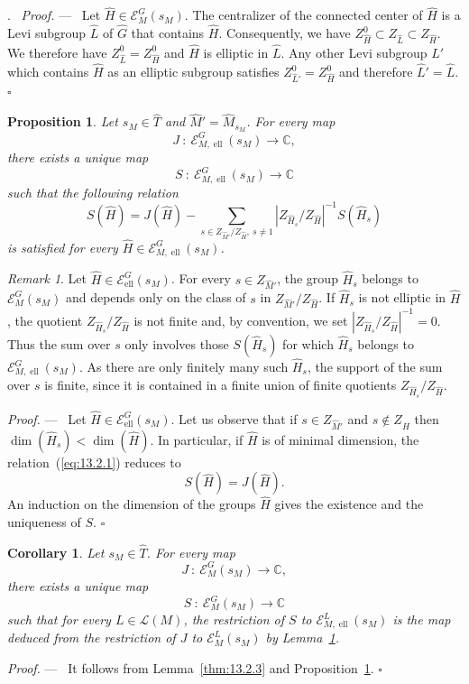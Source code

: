 \documentclass[12pt,a4paper,oneside,english,leqno]{smfart}
\makeatletter
\numberwithin{equation}{subsection}
\newcounter{theo}
\numberwithin{theo}{subsection}
\newenvironment{paragr}[1][]{\medskip\refstepcounter{subsection}%
  \par\noindent\hspace*{\parindent}\thesubsection.\ \emph{#1}%
  \@ifundefined{@empty}{}{}\ignorespaces}{\medskip}
\theoremstyle{plain}
\newtheorem{proposition}[theo]{Proposition}
\newtheorem{corollary}[theo]{Corollary}
\theoremstyle{definition}
\theoremstyle{remark}
\newtheorem{remark}[theo]{Remark}
\newenvironment{preuve}[1][]{\medskip\noindent\textit{Proof.} #1 ---\ }%
  {\hfill\ensuremath{\square}\medskip}
\DeclareMathOperator{\el}{ell}
\newcommand{\CC}{\mathbb{C}}
\newcommand{\ec}{\mathcal{E}}
\newcommand{\lc}{\mathcal{L}}
\newcommand{\Gc}{\widehat{G}}
\newcommand{\Tc}{\widehat{T}}
\newcommand{\Mc}{\widehat{M}}
\newcommand{\Lc}{\widehat{L}}
\newcommand{\Hc}{\widehat{H}}
\makeatother
\begin{document}
\begin{paragr}
\begin{preuve}
Let $\Hc\in\ec_M^G(s_M)$. The centralizer of the connected center of $\Hc$ is a Levi subgroup $\Lc$ of $\Gc$ that contains $\Hc$. Consequently, we have $Z_{\Hc}^0\subset Z_{\Lc}\subset Z_{\Hc}$. We therefore have $Z_{\Lc}^0=Z_{\Hc}^0$ and $\Hc$ is elliptic in $\Lc$. Any other Levi subgroup $\Lc'$ which contains $\Hc$ as an elliptic subgroup satisfies $Z_{\Lc'}^0=Z_{\Hc}^0$ and therefore $\Lc'=\Lc$.
\end{preuve}

\begin{proposition}\label{thm:13.2.4}
Let $s_M\in\Tc$ and $\Mc'=\Mc_{s_M}$. For every map
$$
J\ :\ \ec_{M,\el}^G(s_M)\to\CC,
$$
there exists a unique map
$$
S\ :\ \ec_{M,\el}^G(s_M)\to\CC
$$
such that the following relation
\begin{equation}\label{eq:13.2.1}
S(\Hc)=J(\Hc)-\sum_{s\in Z_{\Mc'}/Z_{\Hc},\ s\neq 1}|Z_{\Hc_s}/Z_{\Hc}|^{-1}S(\Hc_s)
\end{equation}
is satisfied for every $\Hc\in\ec_{M,\el}^G(s_M)$.
\end{proposition}

\begin{remark}\label{thm:13.2.5}
Let $\Hc\in\ec_{\el}^G(s_M)$. For every $s\in Z_{\Mc'}$, the group $\Hc_s$ belongs to $\ec_M^G(s_M)$ and depends only on the class of $s$ in $Z_{\Mc'}/Z_{\Hc}$. If $\Hc_s$ is not elliptic in $\Hc$, the quotient $Z_{\Hc_s}/Z_{\Hc}$ is not finite and, by convention, we set $|Z_{\Hc_s}/Z_{\Hc}|^{-1}=0$. Thus the sum over $s$ only involves those $S(\Hc_s)$ for which $\Hc_s$ belongs to $\ec_{M,\el}^G(s_M)$. As there are only finitely many such $\Hc_s$, the support of the sum over $s$ is finite, since it is contained in a finite union of finite quotients $Z_{\Hc_s}/Z_{\Hc}$.
\end{remark}

\begin{preuve}
Let $\Hc\in\ec_{\el}^G(s_M)$. Let us observe that if $s\in Z_{\Mc'}$ and $s\notin Z_{\Hc}$ then $\dim(\Hc_s)<\dim(\Hc)$. In particular, if $\Hc$ is of minimal dimension, the relation~(\ref{eq:13.2.1}) reduces to
$$
S(\Hc)=J(\Hc).
$$
An induction on the dimension of the groups $\Hc$ gives the existence and the uniqueness of $S$.
\end{preuve}

\begin{corollary}\label{thm:13.2.6}
Let $s_M\in\Tc$. For every map
$$
J\ :\ \ec_M^G(s_M)\to\CC,
$$
there exists a unique map
$$
S\ :\ \ec_M^G(s_M)\to\CC
$$
such that for every $L\in\lc(M)$, the restriction of $S$ to $\ec_{M,\el}^L(s_M)$ is the map deduced from the restriction of $J$ to $\ec_M^L(s_M)$ by Lemma~\ref{thm:13.2.4}.
\end{corollary}

\begin{preuve}
It follows from Lemma~\ref{thm:13.2.3} and Proposition~\ref{thm:13.2.4}.
\end{preuve}
\end{paragr}
\end{document}

